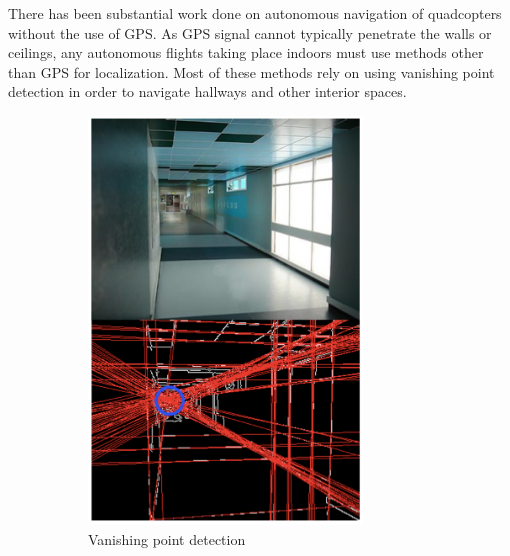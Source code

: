 	There has been substantial work done on autonomous navigation of quadcopters without the use of GPS. As GPS signal cannot typically penetrate the walls or ceilings, any autonomous flights taking place indoors must use methods other than GPS for localization. Most of these methods rely on using vanishing point detection in order to navigate hallways and other interior spaces.

	\begin{figure}[ht]
            \centering
            \begin{subfigure}[b]{0.5\textwidth}
                    \centering
                    \includegraphics[width=0.8\textwidth]{../images/Bills1.png}
                    \caption{Vanishing point detection}
            \end{subfigure}%
            ~ %
            \begin{subfigure}[b]{0.5\textwidth}
                    \centering

\end{subfigure}
\end{figure}
